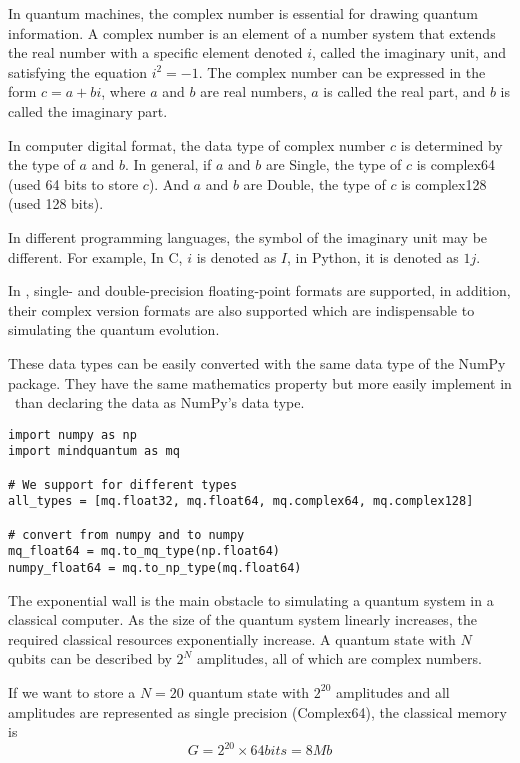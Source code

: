 In quantum machines, the complex number is essential for drawing quantum information. A complex number is an element of a number system that extends the real number with a specific element denoted $i$, called the imaginary unit, and satisfying the equation $i^2=-1$.
The complex number can be expressed in the form $c=a+bi$, where $a$ and $b$ are real numbers, $a$ is called the real part, and $b$ is called the imaginary part.

In computer digital format, the data type of complex number $c$ is determined by the type of $a$ and $b$.
In general, if $a$ and $b$ are Single, the type of $c$ is complex64 (used 64 bits to store $c$). And $a$ and $b$ are Double, the type of $c$ is complex128 (used 128 bits).

In different programming languages, the symbol of the imaginary unit may be different.
For example, In C, $i$ is denoted as $I$, in Python, it is denoted as $1j$.

In \MindQuantum, single- and double-precision floating-point formats are supported, in addition, their complex version formats are also supported which are indispensable to simulating the quantum evolution.

These data types can be easily converted with the same data type of the NumPy\cite{harris2020array} package. They have the same mathematics property but more easily implement in \MindQuantum\ than declaring the data as NumPy's data type.

\begin{lstlisting}
import numpy as np
import mindquantum as mq

# We support for different types
all_types = [mq.float32, mq.float64, mq.complex64, mq.complex128]

# convert from numpy and to numpy
mq_float64 = mq.to_mq_type(np.float64)
numpy_float64 = mq.to_np_type(mq.float64)
\end{lstlisting}

The exponential wall is the main obstacle to simulating a quantum system in a classical computer.
As the size of the quantum system linearly increases, the required classical resources exponentially increase.
A quantum state with $N$ qubits can be described by $2^N$ amplitudes, all of which are complex numbers.

If we want to store a $N=20$ quantum state with $2^{20}$ amplitudes and all amplitudes are represented as single precision (Complex64), the classical memory is
\begin{equation}
    G=2^{20}\times 64 bits = 8 Mb
\end{equation}

